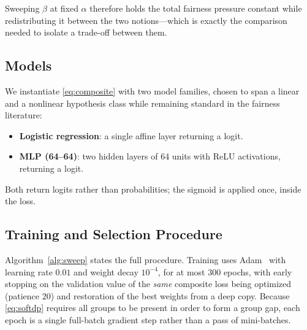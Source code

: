 Sweeping $\beta$ at fixed $\alpha$ therefore holds the total fairness pressure
constant while redistributing it between the two notions---which is exactly
the comparison needed to isolate a trade-off between them.

\subsection{Models}

We instantiate \eqref{eq:composite} with two model families, chosen to span a
linear and a nonlinear hypothesis class while remaining standard in the
fairness literature:
\begin{itemize}
\item \textbf{Logistic regression}: a single affine layer returning a logit.
\item \textbf{MLP (64--64)}: two hidden layers of 64 units with ReLU
      activations, returning a logit.
\end{itemize}
Both return logits rather than probabilities; the sigmoid is applied once,
inside the loss.

\subsection{Training and Selection Procedure}
\label{sec:selection}

Algorithm~\ref{alg:sweep} states the full procedure. Training uses
Adam~\cite{kingma2015adam} with learning rate $0.01$ and weight decay
$10^{-4}$, for at most $300$ epochs, with early stopping on the validation
value of the \emph{same} composite loss being optimized (patience $20$) and
restoration of the best weights from a deep copy. Because \eqref{eq:softdp}
requires all groups to be present in order to form a group gap, each epoch is
a single full-batch gradient step rather than a pass of mini-batches.


